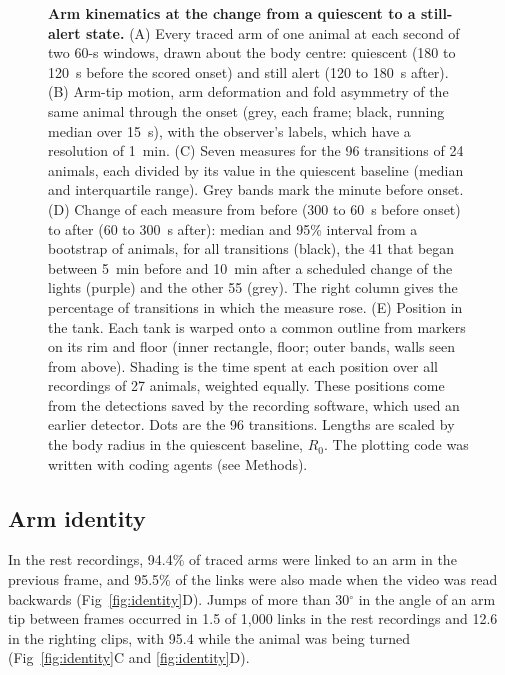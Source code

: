 \begin{figure}[!ht]
\caption{{\bf Arm kinematics at the change from a quiescent to a still-alert state.}
(A) Every traced arm of one animal at each second of two 60-s windows, drawn about the body centre: quiescent (180 to 120~s before the scored onset) and still alert (120 to 180~s after).
(B) Arm-tip motion, arm deformation and fold asymmetry of the same animal through the onset (grey, each frame; black, running median over 15~s), with the observer's labels, which have a resolution of 1~min.
(C) Seven measures for the 96 transitions of 24 animals, each divided by its value in the quiescent baseline (median and interquartile range). Grey bands mark the minute before onset.
(D) Change of each measure from before (300 to 60~s before onset) to after (60 to 300~s after): median and 95\% interval from a bootstrap of animals, for all transitions (black), the 41 that began between 5~min before and 10~min after a scheduled change of the lights (purple) and the other 55 (grey). The right column gives the percentage of transitions in which the measure rose.
(E) Position in the tank. Each tank is warped onto a common outline from markers on its rim and floor (inner rectangle, floor; outer bands, walls seen from above). Shading is the time spent at each position over all recordings of 27 animals, weighted equally. These positions come from the detections saved by the recording software, which used an earlier detector. Dots are the 96 transitions. Lengths are scaled by the body radius in the quiescent baseline, $R_0$. The plotting code was written with coding agents (see Methods).}
\label{fig:rest}
\end{figure}

\subsection*{Arm identity}

In the rest recordings, 94.4\% of traced arms were linked to an arm in the previous frame, and 95.5\% of the links were also made when the video was read backwards (Fig~\ref{fig:identity}D).
Jumps of more than 30$^{\circ}$ in the angle of an arm tip between frames occurred in 1.5 of 1,000 links in the rest recordings and 12.6 in the righting clips, with 95.4 while the animal was being turned (Fig~\ref{fig:identity}C and \ref{fig:identity}D).


